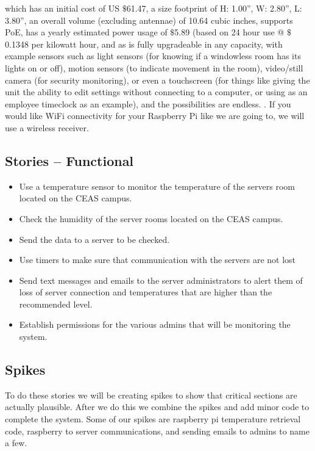 \documentclass{report}
\begin{document}
which has an initial cost of US $\$$61.47, a size footprint of H: 1.00”, W: 2.80”, L: 3.80”, an overall volume (excluding antennae) of 10.64 cubic inches, supports PoE, has a yearly estimated power usage of $\$$5.89 (based on 24 hour use @ $\$$0.1348 per kilowatt hour, and as is fully upgradeable in any capacity, with example sensors such as light sensors (for knowing if a windowless room has its lights on or off), motion sensors (to indicate movement in the room), video/still camera (for security monitoring), or even a touchscreen (for things like giving the unit the ability to edit settings without connecting to a computer, or using as an employee timeclock as an example), and the possibilities are endless.
. If you would like WiFi connectivity for your Raspberry Pi like we are going to, we will use a wireless receiver.
\newpage
\subsection*{Stories -- Functional}
\begin {itemize}
\item Use a temperature sensor to monitor the temperature of the servers room located on the CEAS campus.
\item Check the humidity of the server rooms located on the CEAS campus.
\item Send the data to a server to be checked.
\item Use timers to make sure that communication with the servers are not lost
\item Send text messages and emails to the server administrators to alert them of loss of server connection and temperatures that are higher than the recommended level.
\item Establish permissions for the various admins that will be monitoring the system.
\end {itemize}
\newpage
\subsection*{Spikes}
	To do these stories we will be creating spikes to show that critical sections are actually plausible. After we do this we combine the spikes and add minor code to complete the system. Some of our spikes are raspberry pi temperature retrieval code, raspberry to server communications, and sending emails to admins to name a few. 
\newpage
\end{document}
